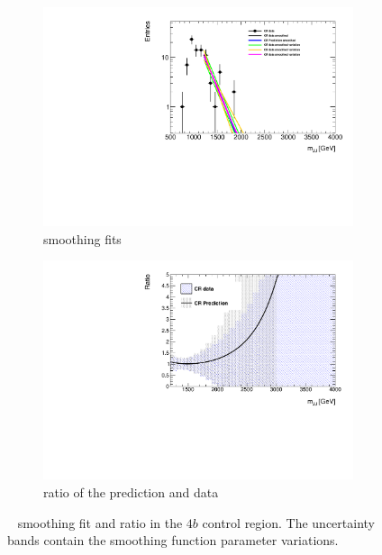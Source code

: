 \begin{figure}[htb!]
\begin{center}
    \captionsetup{justification=centering}
    \hspace{-3cm}
    \begin{subfigure}[b]{0.33\textwidth}
        \includegraphics[width=\textwidth,angle=-90]{figures/boosted/Syst_Shape/QCDSysfitSmooth_44.pdf}
        \caption{smoothing fits}
        \label{fig:qcd_shape_fit_44_fit}
    \end{subfigure}
    \quad \quad \quad \quad \quad
    \begin{subfigure}[b]{0.33\textwidth}
        \includegraphics[width=\textwidth,angle=-90]{figures/boosted/Syst_Shape/QCDSysfitSmooth_ratio_44.pdf}
        \caption{ratio of the prediction and data}
        \label{fig:qcd_shape_fit_44_ratio}
    \end{subfigure}
  \caption{\mtwoJ~ smoothing fit and ratio in the $4b$ control region. The uncertainty bands contain the smoothing function parameter variations.}
  \label{fig:qcd_shape_fit_44}
\end{center}
\end{figure}


